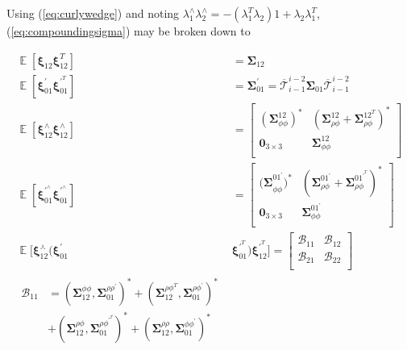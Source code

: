 \documentclass[letterpaper, 10 pt]{ieeeconf}  %
\begin{document}
Using (\ref{eq:curlywedge}) and noting $\lambda_1^\wedge\lambda_2^\wedge=-(\lambda_1^T\lambda_2)1+\lambda_2\lambda_1^T$, (\ref{eq:compoundingsigma}) may be broken down to

\begin{align}
\mathop{\mathbb{E}}[\boldsymbol{\xi}_{12}\boldsymbol{\xi}^T_{12}] &= \boldsymbol{\Sigma}_{12}
\label{eq:compoundingsigmasolution1}\\
\mathop{\mathbb{E}}[\boldsymbol{\xi}^\prime_{01}\boldsymbol{\xi}^{\prime^T}_{01}] &= \boldsymbol{\Sigma}_{01}^{\prime} = \overline{\mathcal{T}}^{i-2}_{i-1} \boldsymbol{\Sigma}_{01} \overline{\mathcal{T}}^{i-2}_{i-1}\\
\mathop{\mathbb{E}}[\boldsymbol{\xi}^\wedge_{12}\boldsymbol{\xi}^\wedge_{12}] &= 
\begin{bmatrix}
(\boldsymbol{\Sigma}^{12}_{\phi\phi})^* & (\boldsymbol{\Sigma}^{12}_{\rho\phi}+\boldsymbol{\Sigma}^{12^T}_{\rho\phi})^*\\
\mathbf{0}_{3\times 3} & \boldsymbol{\Sigma}^{12}_{\phi\phi}\\
\end{bmatrix} \\
\mathop{\mathbb{E}}[\boldsymbol{\xi}^{\prime^\wedge}_{01}\boldsymbol{\xi}^{\prime^\wedge}_{01}] &= 
\begin{bmatrix}
\boldsymbol{(\Sigma}_{\phi\phi}^{01^\prime})^* & (\boldsymbol{\Sigma}_{\rho\phi}^{01^\prime}+\boldsymbol{\Sigma}_{\rho\phi}^{01^{\prime^T}})^* \\
\mathbf{0}_{3\times 3} & \boldsymbol{\Sigma}_{\phi\phi}^{01^\prime}\\
\end{bmatrix}\\
\mathop{\mathbb{E}}[\boldsymbol{\xi}^\curlywedge_{12}(\boldsymbol{\xi}^\prime_{01}&\boldsymbol{\xi}^{\prime^T}_{01})\boldsymbol{\xi}^{\prime^T}_{12}] = \begin{bmatrix}
\mathcal{B}_{11} & \mathcal{B}_{12}\\
\mathcal{B}_{21} & \mathcal{B}_{22}\\
\end{bmatrix}\\
\begin{split}
\mathcal{B}_{11} &= (\boldsymbol{\Sigma}_{12}^{\phi\phi}, \boldsymbol{\Sigma}_{01}^{\rho\rho^\prime})^*+(\boldsymbol{\Sigma}_{12}^{\rho\phi^T}, \boldsymbol{\Sigma}_{01}^{\rho\phi^\prime})^*\\&+(\boldsymbol{\Sigma}_{12}^{\rho\phi}, \boldsymbol{\Sigma}_{01}^{\rho\phi^{\prime^T}})^*+(\boldsymbol{\Sigma}_{12}^{\rho\rho}, \boldsymbol{\Sigma}_{01}^{\phi\phi^\prime})^*

\end{split}
\end{align}
\end{document}
